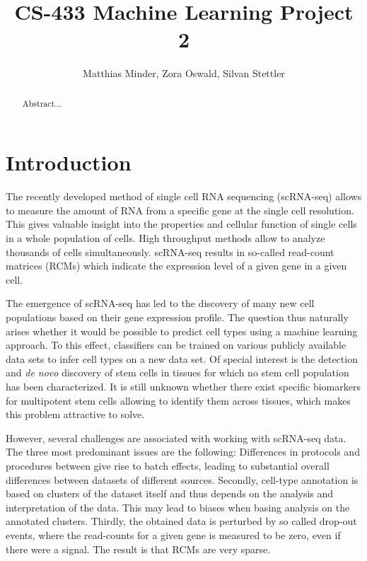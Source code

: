 \documentclass[10pt,conference,compsocconf]{IEEEtran}
\begin{document}
\title{CS-433 Machine Learning Project 2}

\author{
  Matthias Minder, Zora Oswald, Silvan Stettler\\
}

\maketitle

\begin{abstract}
Abstract...
\end{abstract}

\section*{Introduction} 
The recently developed method of single cell RNA sequencing (scRNA-seq) allows to measure the amount of RNA from a specific gene at the single cell resolution. This gives valuable insight into the properties and cellular function of single cells in a whole population of cells. High throughput methods allow to analyze thousands of cells simultaneously. scRNA-seq results in so-called read-count matrices (RCMs) which indicate the expression level of a given gene in a given cell.
\par 
The emergence of scRNA-seq has led to the discovery of many new cell populations based on their gene expression profile. The question thus naturally arises whether it would be possible to predict cell types using a machine learning approach. To this effect, classifiers can be trained on various publicly available data sets to infer cell types on a new data set. Of special interest is the detection and \textit{de novo} discovery of stem cells in tissues for which no stem cell population has been characterized. It is still unknown whether there exist specific biomarkers for multipotent stem cells allowing to identify them across tissues, which makes this problem attractive to solve. 
\par
However, several challenges are associated with working with scRNA-seq data. The three most predominant issues are the following: Differences in protocols and procedures between give rise to batch effects, leading to substantial overall differences between datasets of different sources. Secondly, cell-type annotation is based on clusters of the dataset itself and thus depends on the  analysis and interpretation of the data. This may lead to biases when basing analysis on the annotated clusters. Thirdly, the obtained data is perturbed by so called drop-out events, where the read-counts for a given gene is measured to be zero, even if there were a signal. The result is that RCMs are very sparse. 
\end{document}
